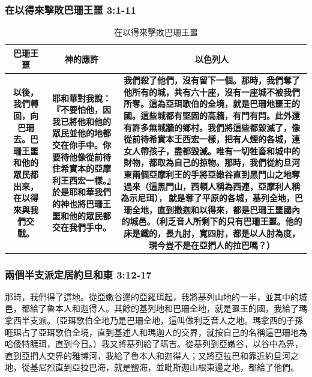 \subsubsection{在以得來擊敗巴珊王噩 3:1-11}
\begin{table}[H]
\begin{threeparttable}
\begin{tabular}{c c c }
\toprule
\multicolumn{1}{L{\dimexpr0.1\linewidth-1\tabcolsep\relax}}{\bfseries 巴珊王噩} 
&\multicolumn{1}{L{\dimexpr0.22\linewidth-1\tabcolsep\relax}}{\bfseries 神的應許 }   
&\multicolumn{1}{L{\dimexpr0.7\linewidth-1\tabcolsep\relax}}{\bfseries 以色列人}  \\\hline
\multicolumn{1}{L{\dimexpr0.1\linewidth-1\tabcolsep\relax}}{\bfseries 以後，我們轉回，向巴珊去。巴珊王噩和他的眾民都出來，在以得來與我們交戰。} 
&\multicolumn{1}{L{\dimexpr0.22\linewidth-1\tabcolsep\relax}}{\bfseries 耶和華對我說：『不要怕他，因我已將他和他的眾民並他的地都交在你手中。你要待他像從前待住希實本的亞摩利王西宏一樣。』於是耶和華我們的神也將巴珊王噩和他的眾民都交在我們手中。}   
&\multicolumn{1}{L{\dimexpr0.7\linewidth-1\tabcolsep\relax}}{\bfseries 我們殺了他們，沒有留下一個。那時，我們奪了他所有的城，共有六十座，沒有一座城不被我們所奪。這為亞珥歌伯的全境，就是巴珊地噩王的國。這些城都有堅固的高牆，有門有閂。此外還有許多無城牆的鄉村。我們將這些都毀滅了，像從前待希實本王西宏一樣，把有人煙的各城，連女人帶孩子，盡都毀滅。唯有一切牲畜和城中的財物，都取為自己的掠物。那時，我們從約旦河東兩個亞摩利王的手將亞嫩谷直到黑門山之地奪過來（這黑門山，西頓人稱為西連，亞摩利人稱為示尼珥）， 就是奪了平原的各城，基列全地，巴珊全地，直到撒迦和以得來，都是巴珊王噩國內的城邑。（利乏音人所剩下的只有巴珊王噩。他的床是鐵的，長九肘，寬四肘，都是以人肘為度，現今豈不是在亞捫人的拉巴嗎？）}  \\\hline
\bottomrule
\end{tabular}
\caption{在以得來擊敗巴珊王噩}
\end{threeparttable}
\end{table} 

\subsubsection{兩個半支派定居約旦和東 3:12-17}
那時，我們得了這地。從亞嫩谷邊的亞羅珥起，我將基列山地的一半，並其中的城邑，都給了魯本人和迦得人。其餘的基列地和巴珊全地，就是噩王的國，我給了瑪拿西半支派。（亞珥歌伯全地乃是巴珊全地，這叫做利乏音人之地。瑪拿西的子孫睚珥占了亞珥歌伯全境，直到基述人和瑪迦人的交界，就按自己的名稱這巴珊地為哈倭特睚珥，直到今日。）我又將基列給了瑪吉。從基列到亞嫩谷，以谷中為界，直到亞捫人交界的雅博河，我給了魯本人和迦得人；又將亞拉巴和靠近約旦河之地，從基尼烈直到亞拉巴海，就是鹽海，並毗斯迦山根東邊之地，都給了他們。

